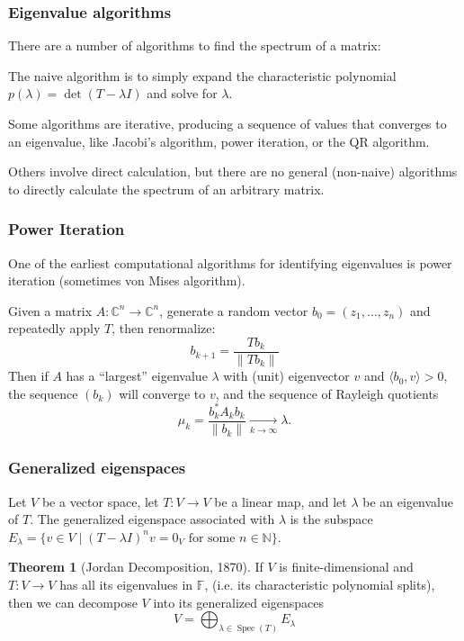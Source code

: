 \documentclass{beamer}
\newcommand{\C}{\mathbb{C}}
\newcommand{\N}{\mathbb{N}}
\DeclareMathOperator{\Spec}{Spec}
\newcommand{\norm}[1]{\left\lVert#1\right\rVert}
\theoremstyle{definition}
\newtheorem*{theorem*}{Theorem}
\begin{document}
\begin{frame}
    \frametitle{Eigenvalue algorithms}

    There are a number of algorithms to find the spectrum of a matrix:

    \pause
    The naive algorithm is to simply expand the characteristic polynomial $p(\lambda) = \det(T - \lambda I)$ and solve for $\lambda$.

    \pause
    Some algorithms are iterative, producing a sequence of values that converges to an eigenvalue, like Jacobi's algorithm, power iteration, or the QR algorithm.

    \pause
    Others involve direct calculation, but there are no general (non-naive) algorithms to directly calculate the spectrum of an arbitrary matrix.
\end{frame}

\begin{frame}
    \frametitle{Power Iteration}

    One of the earliest computational algorithms for identifying eigenvalues is power iteration (sometimes von Mises algorithm).

    \pause
    Given a matrix $A : \C^n \longrightarrow \C^n$, generate a random vector $b_0 = (z_1, \ldots, z_n)$ and repeatedly apply $T$, then renormalize:
    \[
        b_{k+1} = \frac{T b_k}{\norm{T b_k}}
    \]
    \pause
    Then if $A$ has a ``largest'' eigenvalue $\lambda$ with (unit) eigenvector $v$ and $\langle b_0, v \rangle > 0$,
    the sequence $(b_k)$ will converge to $v$, and the sequence of Rayleigh quotients
    \[
        \mu_k = \frac{b_k^* A_k b_k}{\norm{b_k}} \xrightarrow[k\to\infty]{} \lambda.
    \]
\end{frame}

\begin{frame}
    \frametitle{Generalized eigenspaces}

    \begin{definition}
        Let $V$ be a vector space, let $T: V \longrightarrow V$ be a linear map, and let $\lambda$ be an eigenvalue of $T$.
        The generalized eigenspace associated with $\lambda$ is the subspace $E_\lambda = \{v \in V \mid (T - \lambda I)^n v = 0_V \text{ for some } n \in \N\}$.
    \end{definition}
    \begin{theorem*}[Jordan Decomposition, 1870]
        If $V$ is finite-dimensional and $T: V \longrightarrow V$ has all its eigenvalues in $\mathbb{F}$, (i.e. its characteristic polynomial splits), then
        we can decompose $V$ into its generalized eigenspaces
        \[
            V = \bigoplus_{\lambda \in \Spec(T)} E_\lambda  
        \]
    \end{theorem*}
\end{frame}
\end{document}
